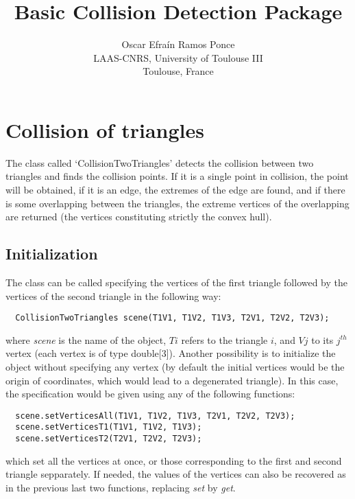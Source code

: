 \documentclass[11pt,a4paper]{article}
\title{\textbf{Basic Collision Detection Package}}
\author{Oscar Efra\'{i}n Ramos Ponce \\
  LAAS-CNRS, University of Toulouse III \\
  Toulouse, France}
\date{}
\begin{document}
\maketitle


\section{Collision of triangles}

The class called `CollisionTwoTriangles' detects the collision between two triangles and finds the collision points. If it is a single point in collision, the point will be obtained, if it is an edge, the extremes of the edge are found, and if there is some overlapping between the triangles, the extreme vertices of the overlapping are returned (the vertices constituting strictly the convex hull).

\subsection*{Initialization}
The class can be called specifying the vertices of the first triangle followed by the vertices of the second triangle in the following way: 
  \begin{lstlisting}
  CollisionTwoTriangles scene(T1V1, T1V2, T1V3, T2V1, T2V2, T2V3);
  \end{lstlisting}
where \textit{scene} is the name of the object, $Ti$ refers to the triangle $i$, and $Vj$ to its $j^{th}$ vertex (each vertex is of type double[3]). Another possibility is to initialize the object without specifying any vertex (by default the initial vertices would be the origin of coordinates, which would lead to a degenerated triangle). In this case, the specification would be given using any of the following functions:
\begin{lstlisting}
  scene.setVerticesAll(T1V1, T1V2, T1V3, T2V1, T2V2, T2V3);
  scene.setVerticesT1(T1V1, T1V2, T1V3);
  scene.setVerticesT2(T2V1, T2V2, T2V3);
\end{lstlisting}
which set all the vertices at once, or those corresponding to the first and second triangle sepparately. If needed, the values of the vertices can also be recovered as in the previous last two functions, replacing \textit{set} by \textit{get}.
\end{document}
